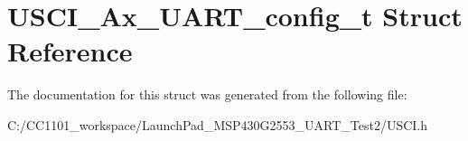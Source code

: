 \hypertarget{struct_u_s_c_i___ax___u_a_r_t__config__t}{\section{U\-S\-C\-I\-\_\-\-Ax\-\_\-\-U\-A\-R\-T\-\_\-config\-\_\-t Struct Reference}
\label{struct_u_s_c_i___ax___u_a_r_t__config__t}
}


The documentation for this struct was generated from the following file\-:\begin{DoxyCompactItemize}
\item 
C\-:/\-C\-C1101\-\_\-workspace/\-Launch\-Pad\-\_\-\-M\-S\-P430\-G2553\-\_\-\-U\-A\-R\-T\-\_\-\-Test2/U\-S\-C\-I.\-h\end{DoxyCompactItemize}

